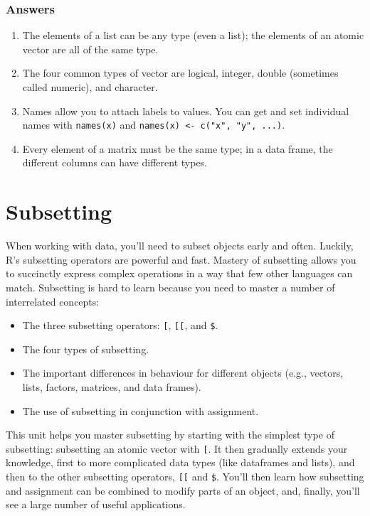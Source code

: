 \documentclass[]{book}
\begin{document}
\hypertarget{data-structure-answers}{%
\subsection{Answers}\label{data-structure-answers}}

\begin{enumerate}
\def\labelenumi{\arabic{enumi}.}
\item
  The elements of a list can be any type (even a list); the elements of an atomic vector are all of the same type.
\item
  The four common types of vector are logical, integer, double (sometimes called numeric), and character.
\item
  Names allow you to attach labels to values. You can get and set individual names with \texttt{names(x)} and \texttt{names(x)\ \textless{}-\ c("x",\ "y",\ ...)}.
\item
  Every element of a matrix must be the same type; in a data frame, the different columns can have different types.
\end{enumerate}

\hypertarget{subsetting}{%
\chapter{Subsetting}\label{subsetting}}

When working with data, you'll need to subset objects early and often. Luckily, R's subsetting operators are powerful and fast. Mastery of subsetting allows you to succinctly express complex operations in a way that few other languages can match. Subsetting is hard to learn because you need to master a number of interrelated concepts:

\begin{itemize}
\item
  The three subsetting operators: \texttt{{[}}, \texttt{{[}{[}}, and \texttt{\$}.
\item
  The four types of subsetting.
\item
  The important differences in behaviour for different objects (e.g., vectors, lists, factors, matrices, and data frames).
\item
  The use of subsetting in conjunction with assignment.
\end{itemize}

This unit helps you master subsetting by starting with the simplest type of subsetting: subsetting an atomic vector with \texttt{{[}}. It then gradually extends your knowledge, first to more complicated data types (like dataframes and lists), and then to the other subsetting operators, \texttt{{[}{[}} and \texttt{\$}. You'll then learn how subsetting and assignment can be combined to modify parts of an object, and, finally, you'll see a large number of useful applications.
\end{document}
